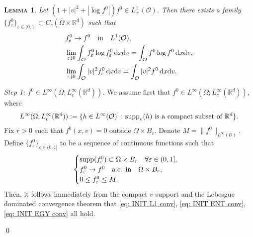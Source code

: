 \documentclass[10pt, reqno]{amsart}
\theoremstyle{plain}
\newtheorem{lemma}[theorem]{\normalfont \scshape Lemma}
\theoremstyle{definition}
\theoremstyle{remark}
\renewenvironment{proof}[1][\proofname]{\noindent{\scshape #1.\quad}}{\qed}
\numberwithin{equation}{section}
\newcommand{\calO}{\mathcal O}
\newcommand{\R}{\mathbb{R}}
\newcommand{\ve}{\varepsilon}
\newcommand{\dx}{\textnormal{d}x}
\newcommand{\dv}{\textnormal{d}v}
\begin{document}
\begin{lemma} \label{lem: INIT}
    Let $(1+|v|^2 + |\log f^0|)f^0\in L^1_+(\calO)$. Then there exists a family $\{f^0_\ve\}_{\ve\in (0,1]} \subset C_c(\overline{\Omega}\times\R^d)$ such that
    \begin{align}
        &f_\ve^0 \to f^0 \quad \text{in} \quad L^1(\calO), \label{eq: INIT L1 conv}\\
        &\lim_{\ve\downarrow 0} \int_{\calO} f_\ve^0 \log f_\ve^0 \,\dx\dv  = \int_{\calO} f^0 \log f^0 \,\dx\dv , \label{eq: INIT ENT conv}\\
        &\lim_{\ve\downarrow 0} \int_{\calO} |v|^2 f_\ve^0 \,\dx\dv = \int_{\calO} |v|^2 f^0 \,\dx\dv. \label{eq: INIT EGY conv}
    \end{align}
\end{lemma}
\begin{proof}
    \textit{Step 1: $f^0\in L^\infty(\Omega;L^\infty_c(\R^d))$.} We assume first that $f^0\in L^\infty(\Omega;L^\infty_c(\R^d))$, where
    \begin{align*}
        L^\infty(\Omega;L^\infty_c(\R^d)) := \{h\in L^\infty(\calO) \, : \, \textnormal{supp}_v (h) \text{ is a compact subset of $\R^d$} \}.
    \end{align*}
    Fix $r>0$ such that $f^0(x,v) = 0$ outside $\Omega\times B_r$. Denote $M=\|f^0\|_{L^\infty(\calO)}$. Define $\{f_\ve^0\}_{\ve\in (0,1]}$ to be a sequence of continuous functions such that
    \begin{align*}
    \begin{cases}
        \textnormal{supp}(f_\ve^0) \subset \Omega\times B_r \quad \forall \ve\in (0,1],\\
        f_\ve^0 \to f^0 \quad \text{a.e. in}\quad \Omega\times B_r,\\
        0\le f_\ve^0 \le M.
    \end{cases}
    \end{align*}
    Then, it follows immediately from the compact $v$-support and the Lebesgue dominated convergence theorem that \eqref{eq: INIT L1 conv}, \eqref{eq: INIT ENT conv}, \eqref{eq: INIT EGY conv} all hold.


\end{proof}
\end{document}
